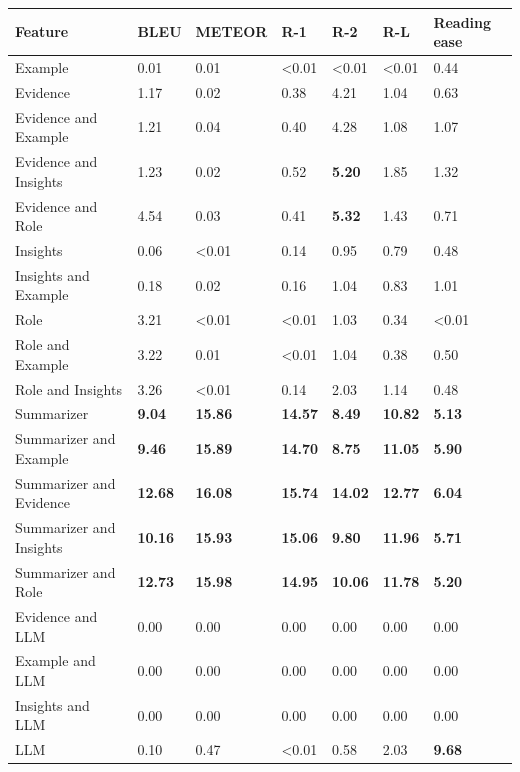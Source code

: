 \begin{tabular}{|l|l|l|l|l|l|l|}
\hline
\textbf{Feature} & BLEU & METEOR & R-1 & R-2 & R-L & Reading ease \\
 \hline
 Example & 0.01 & 0.01 & \textless{}0.01 & \textless{}0.01 & \textless{}0.01 & 0.44 \\
 \hline
 Evidence & 1.17 & 0.02 & 0.38 & 4.21 & 1.04 & 0.63 \\
 \hline
 Evidence and Example & 1.21 & 0.04 & 0.40 & 4.28 & 1.08 & 1.07 \\
 \hline
 Evidence and Insights & 1.23 & 0.02 & 0.52 & \textbf{5.20} & 1.85 & 1.32 \\
 \hline
 Evidence and Role & 4.54 & 0.03 & 0.41 & \textbf{5.32} & 1.43 & 0.71 \\
 \hline
 Insights & 0.06 & \textless{}0.01 & 0.14 & 0.95 & 0.79 & 0.48 \\
 \hline
 Insights and Example & 0.18 & 0.02 & 0.16 & 1.04 & 0.83 & 1.01 \\
 \hline
 Role & 3.21 & \textless{}0.01 & \textless{}0.01 & 1.03 & 0.34 & \textless{}0.01 \\
 \hline
 Role and Example & 3.22 & 0.01 & \textless{}0.01 & 1.04 & 0.38 & 0.50 \\
 \hline
 Role and Insights & 3.26 & \textless{}0.01 & 0.14 & 2.03 & 1.14 & 0.48 \\
 \hline
 Summarizer & \textbf{9.04} & \textbf{15.86} & \textbf{14.57} & \textbf{8.49} & \textbf{10.82} & \textbf{5.13} \\
 \hline
 Summarizer and Example & \textbf{9.46} & \textbf{15.89} & \textbf{14.70} & \textbf{8.75} & \textbf{11.05} & \textbf{5.90} \\
 \hline
 Summarizer and Evidence & \textbf{12.68} & \textbf{16.08} & \textbf{15.74} & \textbf{14.02} & \textbf{12.77} & \textbf{6.04} \\
 \hline
 Summarizer and Insights & \textbf{10.16} & \textbf{15.93} & \textbf{15.06} & \textbf{9.80} & \textbf{11.96} & \textbf{5.71} \\
 \hline
 Summarizer and Role & \textbf{12.73} & \textbf{15.98} & \textbf{14.95} & \textbf{10.06} & \textbf{11.78} & \textbf{5.20} \\
 \hline
 Evidence and LLM & 0.00 & 0.00 & 0.00 & 0.00 & 0.00 & 0.00 \\
 \hline
 Example and LLM & 0.00 & 0.00 & 0.00 & 0.00 & 0.00 & 0.00 \\
 \hline
 Insights and LLM & 0.00 & 0.00 & 0.00 & 0.00 & 0.00 & 0.00 \\
 \hline
 LLM & 0.10 & 0.47 & \textless{}0.01 & 0.58 & 2.03 & \textbf{9.68} \\

\end{tabular}
